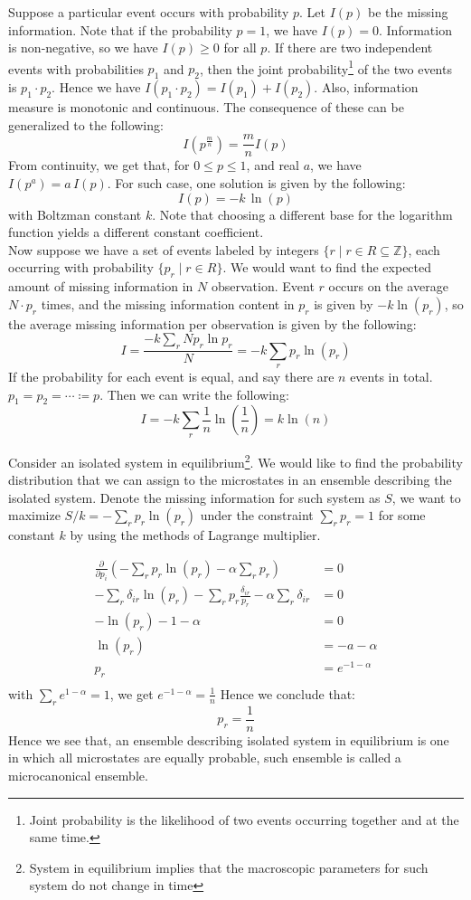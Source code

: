 \documentclass[11pt,oneside]{book}
\theoremstyle{break}
\theoremstyle{break}
\newcommand{\Z}{\mathbb{Z}}
\newcommand{\pd}{\partial}
\begin{document}
Suppose a particular event occurs with probability $p$. Let $I(p)$ be the missing information. Note that if the probability $p = 1$, we have $I(p) = 0$. Information is non-negative, so we have $I(p) \geq 0$ for all $p$. If there are two independent events with probabilities $p_1$ and $p_2$, then the joint probability\footnote{Joint probability is the likelihood of two events occurring together and at the same time.} of the two events is $p_1 \cdot p_2$. Hence we have $I(p_1\cdot p_2) = I(p_1) + I(p_2)$. Also, information measure is monotonic and continuous. The consequence of these can be generalized to the following:
$$I(p^{\frac{m}{n}}) = \frac{m}{n}I(p)$$
From continuity, we get that, for $0\leq p \leq 1$, and real $a$, we have $I(p^a) = a \, I (p)$. 
For such case, one solution is given by the following:
$$I(p) = -k\, \ln (p)$$
with Boltzman constant $k$. Note that choosing a different base for the logarithm function yields a different constant coefficient. \\

Now suppose we have a set of events labeled by integers $\{r \mid r\in R \subseteq \Z\}$, each occurring with probability $\{ p_r \mid r \in R\}$. We would want to find the expected amount of missing information in $N$ observation. Event $r$ occurs on the average $N\cdot p_r$ times, and the missing information content in $p_r$ is given by $-k \ln (p_r)$, so the average missing information per observation is given by the following:
$$I = \frac{-k \sum_r N p_r \ln p_r}{N} = -k \sum_r p_r \ln (p_r)$$
If the probability for each event is equal, and say there are $n$ events in total. $p_1 = p_2 = \cdots  \coloneqq p$. Then we can write the following:
$$I = -k \sum_r \frac{1}{n} \ln\left(\frac{1}{n}\right) = k\ln(n)$$
\newpage

Consider an isolated system in equilibrium\footnote{System in equilibrium implies that the macroscopic parameters for such system do not change in time}. We would like to find the probability distribution that we can assign to the microstates in an ensemble describing the isolated system. Denote the missing information for such system as $S$, we want to maximize $S/k = -\sum_r p_r \ln (p_r)$ under the constraint $\sum_r p_r = 1$ for some constant $k$ by using the methods of Lagrange multiplier. 

\begin{align*}
\frac{\pd}{\pd p_i}\left( -\sum_r p_r \ln(p_r) - \alpha \sum_r p_r\right) &= 0\\
-\sum_r \delta_{ir} \ln( p_r) - \sum_r p_r \frac{\delta_{ir}}{p_r} - \alpha\sum_r \delta_{ir} &= 0\\
-\ln(p_r) - 1 - \alpha &= 0\\
\ln(p_r) &= -a-\alpha \\
p_r &= e^{-1-\alpha}\\
\end{align*}
with $\sum_r e^{1-\alpha} = 1$, we get $e^{-1-\alpha} = \frac{1}{n}$
Hence we conclude that:
$$p_r = \frac{1}{n}$$
Hence we see that, an ensemble describing isolated system in equilibrium is one in which all microstates are equally probable, such ensemble is called a microcanonical ensemble.\\
\hfill\break
\end{document}
